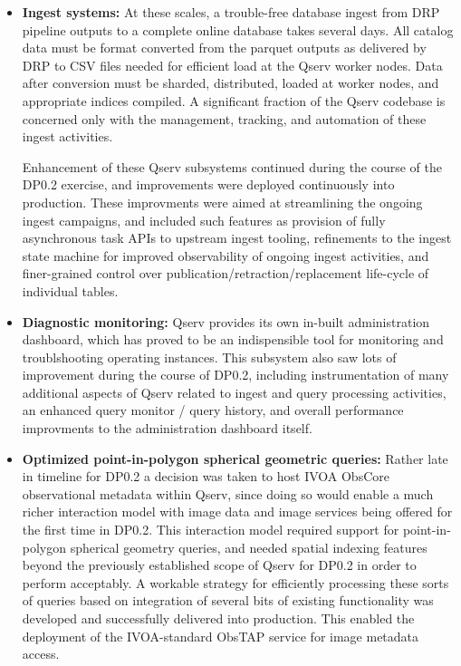\begin{itemize}

\item
  \textbf{Ingest systems:} At these scales, a trouble-free database ingest from DRP pipeline outputs to a
  complete online database takes several days.  All catalog data must be format converted from the parquet
  outputs as delivered by DRP to CSV files needed for efficient load at the Qserv worker nodes.  Data after
  conversion must be sharded, distributed, loaded at worker nodes, and appropriate indices compiled.  A
  significant fraction of the Qserv codebase is concerned only with the management, tracking, and automation
  of these ingest activities.

  Enhancement of these Qserv subsystems continued during the course of the DP0.2 exercise, and improvements
  were deployed continuously into production.  These improvments were aimed at streamlining the ongoing ingest
  campaigns, and included such features as provision of fully asynchronous task APIs to upstream ingest
  tooling, refinements to the ingest state machine for improved observability of ongoing ingest activities,
  and finer-grained control over publication/retraction/replacement life-cycle of individual tables.

\item
  \textbf{Diagnostic monitoring:} Qserv provides its own in-built administration dashboard, which has proved
  to be an indispensible tool for monitoring and troublshooting operating instances.  This subsystem also saw
  lots of improvement during the course of DP0.2, including instrumentation of many additional aspects of
  Qserv related to ingest and query processing activities, an enhanced query monitor / query history, and
  overall performance improvments to the administration dashboard itself.

\item
  \textbf{Optimized point-in-polygon spherical geometric queries:} Rather late in timeline for DP0.2 a
  decision was taken to host IVOA ObsCore observational metadata within Qserv, since doing so would enable a
  much richer interaction model with image data and image services being offered for the first time in DP0.2.
  This interaction model required support for point-in-polygon spherical geometry queries, and needed spatial
  indexing features beyond the previously established scope of Qserv for DP0.2 in order to perform acceptably.
  A workable strategy for efficiently processing these sorts of queries based on integration of several bits
  of existing functionality was developed and successfully delivered into production.
  This enabled the deployment of the IVOA-standard ObsTAP service for image metadata access.


\end{itemize}
